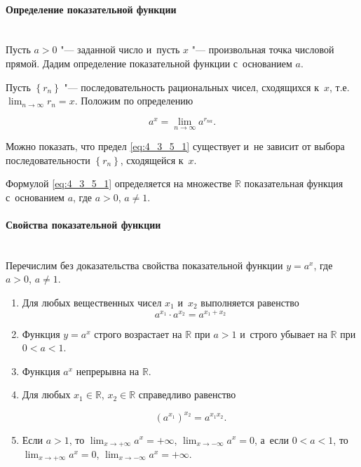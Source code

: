 
\paragraph{Определение показательной функции}\mbox{} \\

Пусть $a > 0$ "--- заданной число и~пусть $x$ "--- произвольная точка
числовой прямой. Дадим определение показательной функции с~основанием $a$.

Пусть $\left\{ r_{n} \right\}$ "--- последовательность рациональных чисел,
сходящихся к~$x$, т.е.\ $\displaystyle \lim_{n \to \infty} r_{n} = x$.
Положим по определению

\begin{equation}\label{eq:4_3_5_1}
\displaystyle a^{x} = \lim_{n \to \infty} a^{r_{na}}.
\end{equation}

Можно показать, что предел \eqref{eq:4_3_5_1} существует и~не зависит от выбора
последовательности $\left\{ r_{n} \right\}$, сходящейся к~$x$.

Формулой \eqref{eq:4_3_5_1} определяется на множестве $\mathbb{R}$
показательная функция с~основанием $a$, где $a > 0$, $a \ne 1$.

\paragraph{Свойства показательной функции}\mbox{} \\

Перечислим без доказательства свойства показательной функции
$y = a^{x}$, где $a > 0$, $a \ne 1$.

\begin{enumerate}
\item Для любых вещественных чисел $x_{1}$ и~$x_{2}$ выполняется равенство
\begin{equation*}
a^{x_{1}} \cdot a^{x_{2}} = a^{x_{1} + x_{2}}
\end{equation*}

\item Функция $y = a^{x}$ строго возрастает на $\mathbb{R}$ при $a > 1$ и~строго
убывает на $\mathbb{R}$ при $0 < a <1$.

\item Функция $a^{x}$ непрерывна на $\mathbb{R}$.

\item Для любых $x_{1} \in \mathbb{R}$, $x_{2} \in \mathbb{R}$ справедливо равенство

\begin{equation*}
\left( a^{x_{1}} \right)^{x_{2}} = a^{x_{1}x_{2}}.
\end{equation*}

\item Если $a > 1$, то $\displaystyle \lim_{x \to +\infty} a^{x} = +\infty$,
$\displaystyle \lim_{x \to -\infty} a^{x} = 0$, а~если $0 < a < 1$, то
$\displaystyle \lim_{x \to +\infty} a^{x} = 0$,
$\displaystyle \lim_{x \to -\infty} a^{x} = +\infty$.

\end{enumerate}

